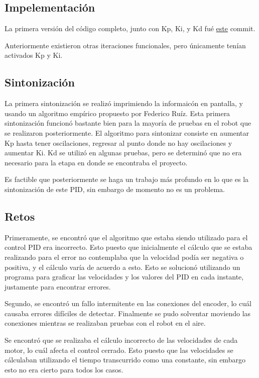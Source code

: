 \subsection{Impelementación}

La primera versión del código completo, junto con Kp, Ki, y Kd fué \href{https://github.com/arcoslab/stm32-roboclaw/commit/c8343d63d9700cd875b26012ce02b7371ca90b14#diff-33370e836e50db43bdb5933ccd61ab9e}{este} commit.


Anteriormente existieron otras iteraciones funcionales, pero únicamente tenían activados Kp y Ki.

\subsection{Sintonización}

La primera sintonización se realizó imprimiendo la informaicón en pantalla, y usando un algoritmo empírico propuesto por Federico Ruíz. Esta primera sintonización funcionó bastante bien para la mayoría de pruebas en el robot que se realizaron posteriormente. El algoritmo para sintonizar consiste en aumentar Kp hasta tener oscilaciones, regresar al punto donde no hay oscilaciones y aumentar Ki. Kd se utilizó en algunas pruebas, pero se determinó que no era necesario para la etapa en donde se encontraba el proyecto.

Es factible que posteriormente se haga un trabajo más profundo en lo que es la sintonización de este PID, sin embargo de momento no es un problema.

\subsection{Retos}
Primeramente, se encontró que el algoritmo que estaba siendo utilizado para el control PID era incorrecto. Esto puesto que inicialmente el cálculo que se estaba realizando para el error no contemplaba que la velocidad podía ser negativa o positiva, y el cálculo varía de acuerdo a esto. Esto se solucionó utilizando un programa para graficar las velocidades y los valores del PID en cada instante, justamente para encontrar errores.

Segundo, se encontró un fallo intermitente en las conexiones del encoder, lo cuál causaba errores difíciles de detectar. Finalmente se pudo solventar moviendo las conexiones mientras se realizaban pruebas con el robot en el aire.

Se encontró que se realizaba el cálculo incorrecto de las velocidades de cada motor, lo cuál afecta el control cerrado. Esto puesto que las velocidades se cálculaban utilizando el tiempo transcurrido como una constante, sin embargo esto no era cierto para todos los casos.

